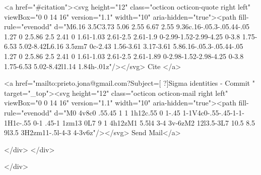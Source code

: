       <a  href="#citation"><svg height="12" class="octicon octicon-quote right left" viewBox="0 0 14 16" version="1.1" width="10" aria-hidden="true"><path fill-rule="evenodd" d="M6.16 3.5C3.73 5.06 2.55 6.67 2.55 9.36c.16-.05.3-.05.44-.05 1.27 0 2.5.86 2.5 2.41 0 1.61-1.03 2.61-2.5 2.61-1.9 0-2.99-1.52-2.99-4.25 0-3.8 1.75-6.53 5.02-8.42L6.16 3.5zm7 0c-2.43 1.56-3.61 3.17-3.61 5.86.16-.05.3-.05.44-.05 1.27 0 2.5.86 2.5 2.41 0 1.61-1.03 2.61-2.5 2.61-1.89 0-2.98-1.52-2.98-4.25 0-3.8 1.75-6.53 5.02-8.42l1.14 1.84h-.01z"/></svg> Cite
      </a>

      <a href="mailto:prieto.jona@gmail.com?Subject=[ ?]Sigma identities - Commit " target="_top"><svg height="12" class="octicon octicon-mail right left" viewBox="0 0 14 16" version="1.1" width="10" aria-hidden="true"><path fill-rule="evenodd" d="M0 4v8c0 .55.45 1 1 1h12c.55 0 1-.45 1-1V4c0-.55-.45-1-1-1H1c-.55 0-1 .45-1 1zm13 0L7 9 1 4h12zM1 5.5l4 3-4 3v-6zM2 12l3.5-3L7 10.5 8.5 9l3.5 3H2zm11-.5l-4-3 4-3v6z"/></svg> Send Mail</a>

    </div>
  </div>

</div>




